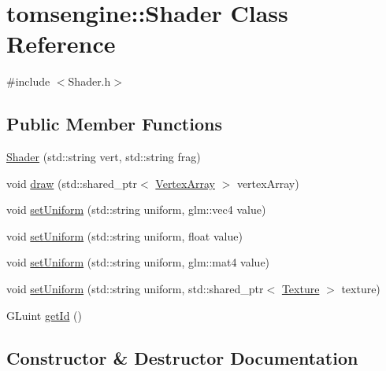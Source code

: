 \hypertarget{classtomsengine_1_1_shader}{}\section{tomsengine\+:\+:Shader Class Reference}
\label{classtomsengine_1_1_shader}


{\ttfamily \#include $<$Shader.\+h$>$}

\subsection*{Public Member Functions}
\begin{DoxyCompactItemize}
\item 
\mbox{\hyperlink{classtomsengine_1_1_shader_ac9d4712f35e8d3031973c49d8290b34d}{Shader}} (std\+::string vert, std\+::string frag)
\item 
void \mbox{\hyperlink{classtomsengine_1_1_shader_af63fb3f1221631fd17ee7e814eec579c}{draw}} (std\+::shared\+\_\+ptr$<$ \mbox{\hyperlink{classtomsengine_1_1_vertex_array}{Vertex\+Array}} $>$ vertex\+Array)
\item 
void \mbox{\hyperlink{classtomsengine_1_1_shader_a2bcc5799fdbed02cf8fc57a2db0bf1f2}{set\+Uniform}} (std\+::string uniform, glm\+::vec4 value)
\item 
void \mbox{\hyperlink{classtomsengine_1_1_shader_ac2273cc9e24be079c10bf957236044be}{set\+Uniform}} (std\+::string uniform, float value)
\item 
void \mbox{\hyperlink{classtomsengine_1_1_shader_ae17443671c6e427199bc3da08b790438}{set\+Uniform}} (std\+::string uniform, glm\+::mat4 value)
\item 
void \mbox{\hyperlink{classtomsengine_1_1_shader_a604bd6c3971d78104253a6ee04421cbd}{set\+Uniform}} (std\+::string uniform, std\+::shared\+\_\+ptr$<$ \mbox{\hyperlink{classtomsengine_1_1_texture}{Texture}} $>$ texture)
\item 
G\+Luint \mbox{\hyperlink{classtomsengine_1_1_shader_aa7f2be24efa50e52bb3dfe03551e3792}{get\+Id}} ()
\end{DoxyCompactItemize}


\subsection{Constructor \& Destructor Documentation}
\mbox{\label{classtomsengine_1_1_shader_ac9d4712f35e8d3031973c49d8290b34d}} 
